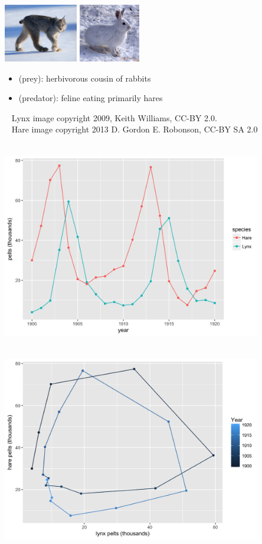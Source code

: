 \documentclass[10pt]{report}
\begin{document}
%
\begin{center}
\includegraphics[height=1in]{img/lynx.jpg}
\hspace*{0.25in}
\includegraphics[height=1in]{img/hare.jpg}
\end{center}
\begin{itemize}
\item {} (prey): herbivorous cousin of rabbits
\item {} (predator): feline eating primarily hares
\end{itemize}
\vfill
{\tiny
\mbox{ } \hfill
Lynx image copyright 2009, Keith Williams, CC-BY 2.0.
\\[-2pt]
\mbox{ } \hfill
Hare image copyright 2013 D. Gordon E. Robonson, CC-BY SA 2.0}


%
\\[-4pt] \spc
\includegraphics[width=0.85\textwidth]{img/hare-lynx-pelts-1.png}


%
\\[-4pt] \spc
\includegraphics[width=0.85\textwidth]{img/hare-lynx-pelts-2.png}
\end{document}

